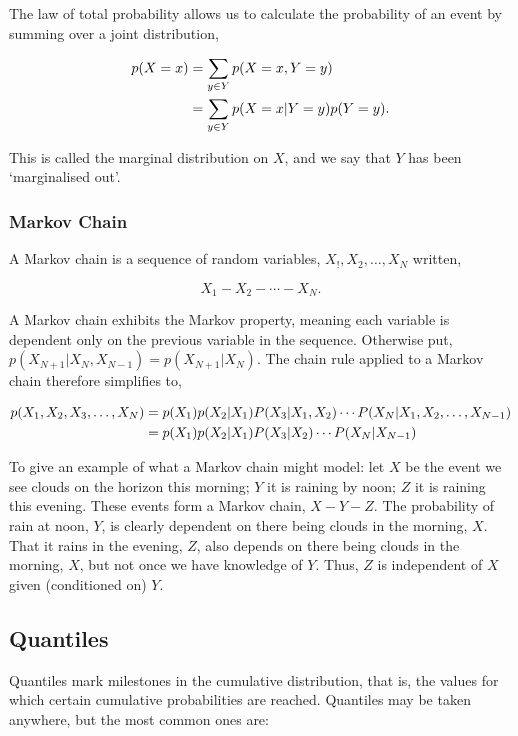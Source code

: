 \documentclass[11pt]{amsart}
\begin{document}
The law of total probability allows us to calculate the probability of an event by summing over a joint distribution,

\begin{align}
p(X=x) &= \sum_{y \in Y} p(X=x, Y=y) \notag \\
&= \sum_{y \in Y} p(X=x|Y=y)p(Y=y). \notag
\end{align}

This is called the marginal distribution on $X$, and we say that $Y$ has been `marginalised out'.

\subsubsection{Markov Chain}
A Markov chain is a sequence of random variables, $X_!, X_2, \dots, X_N$ written,

$$X_1 - X_2 - \cdots - X_N.$$

A Markov chain exhibits the Markov property, meaning each variable is dependent only on the previous variable in the sequence. Otherwise put, $p(X_{N+1}|X_N, X_{N-1}) = p(X_{N+1}|X_N)$. The chain rule applied to a Markov chain therefore simplifies to,

\begin{align}
p(X_1, X_2, X_3,\dots,X_N) &= p(X_1)p(X_2|X_1)P(X_3|X_1, X_2)\cdots P(X_N|X_1, X_2, \dots, X_{N-1}) \notag \\
 &= p(X_1)p(X_2|X_1)P(X_3|X_2)\cdots P(X_N|X_{N-1}) \notag
\end{align}

To give an example of what a Markov chain might model: let $X$ be the event we see clouds on the horizon this morning; $Y$ it is raining by noon; $Z$ it is raining this evening. These events form a Markov chain, $X-Y-Z$. The probability of rain at noon, $Y$, is clearly dependent on there being clouds in the morning, $X$. That it rains in the evening, $Z$, also depends on there being clouds in the morning, $X$, but not once we have knowledge of $Y$. Thus, $Z$ is independent of $X$ given (conditioned on) $Y$.

\subsection{Quantiles}

Quantiles mark milestones in the cumulative distribution, that is, the values for which certain cumulative probabilities are reached. Quantiles may be taken anywhere, but the most common ones are:
\end{document}
